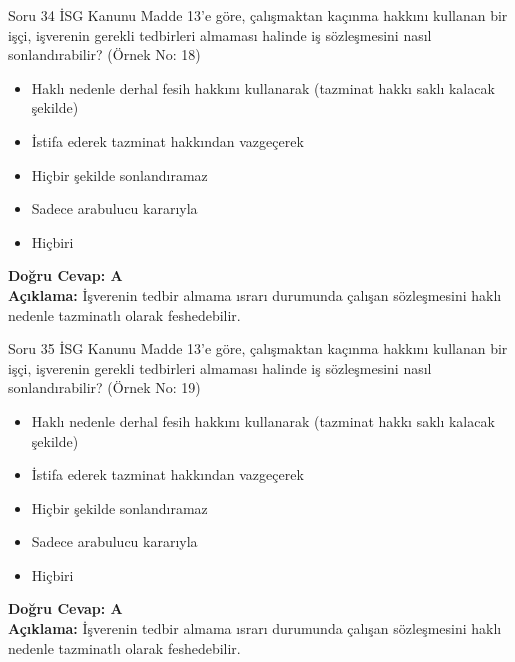 \documentclass[12pt,a4paper]{article}
\begin{document}
\begin{testcard}{Soru 34}
    İSG Kanunu Madde 13'e göre, çalışmaktan kaçınma hakkını kullanan bir işçi, işverenin gerekli tedbirleri almaması halinde iş sözleşmesini nasıl sonlandırabilir? (Örnek No: 18)
    \begin{itemize}
        \item[A)] Haklı nedenle derhal fesih hakkını kullanarak (tazminat hakkı saklı kalacak şekilde)
        \item[B)] İstifa ederek tazminat hakkından vazgeçerek
        \item[C)] Hiçbir şekilde sonlandıramaz
        \item[D)] Sadece arabulucu kararıyla
        \item[E)] Hiçbiri
    \end{itemize}
    \tcblower
    \textbf{Doğru Cevap: A} \\
    \textbf{Açıklama:} İşverenin tedbir almama ısrarı durumunda çalışan sözleşmesini haklı nedenle tazminatlı olarak feshedebilir.
\end{testcard}

\begin{testcard}{Soru 35}
    İSG Kanunu Madde 13'e göre, çalışmaktan kaçınma hakkını kullanan bir işçi, işverenin gerekli tedbirleri almaması halinde iş sözleşmesini nasıl sonlandırabilir? (Örnek No: 19)
    \begin{itemize}
        \item[A)] Haklı nedenle derhal fesih hakkını kullanarak (tazminat hakkı saklı kalacak şekilde)
        \item[B)] İstifa ederek tazminat hakkından vazgeçerek
        \item[C)] Hiçbir şekilde sonlandıramaz
        \item[D)] Sadece arabulucu kararıyla
        \item[E)] Hiçbiri
    \end{itemize}
    \tcblower
    \textbf{Doğru Cevap: A} \\
    \textbf{Açıklama:} İşverenin tedbir almama ısrarı durumunda çalışan sözleşmesini haklı nedenle tazminatlı olarak feshedebilir.
\end{testcard}
\end{document}
